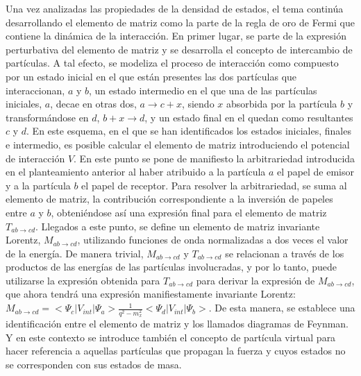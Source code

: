 Una vez analizadas las propiedades de la densidad de estados, el tema continúa desarrollando el elemento de matriz como la parte de la regla de oro de Fermi que contiene la dinámica de la interacción. En primer lugar, se parte de la expresión perturbativa del elemento de matriz y se desarrolla el concepto de intercambio de partículas. A tal efecto, se modeliza el proceso de interacción como compuesto por un estado inicial en el que están presentes las dos partículas que interaccionan, $a$ y $b$, un estado intermedio en el que una de las partículas iniciales, $a$, decae en otras dos, $a\rightarrow c + x$, siendo $x$ absorbida por la partícula $b$ y transformándose en $d$, $b + x\rightarrow d$, y un estado final en el quedan como resultantes $c$ y $d$. En este esquema, en el que se han identificados los estados iniciales, finales e intermedio, es posible calcular el elemento de matriz introduciendo el potencial de interacción $V$. En este punto se pone de manifiesto la arbitrariedad introducida en el planteamiento anterior al haber atribuido a la partícula $a$ el papel de emisor y a la partícula $b$ el papel de receptor. Para resolver la arbitrariedad, se suma al elemento de matriz, la contribución correspondiente a la inversión de papeles entre $a$ y $b$, obteniéndose así una expresión final para el elemento de matriz $T_{ab\rightarrow cd}$. Llegados a este punto, se define un elemento de matriz invariante Lorentz, $M_{ab\rightarrow cd}$, utilizando funciones de onda normalizadas a dos veces el valor de la energía. De manera trivial, $M_{ab\rightarrow cd}$ y $T_{ab\rightarrow cd}$ se relacionan a través de los productos de las energías de las partículas involucradas, y por lo tanto, puede utilizarse la expresión obtenida para $T_{ab\rightarrow cd}$ para derivar la expresión de $M_{ab\rightarrow cd}$, que ahora tendrá una expresión manifiestamente invariante Lorentz: $M_{ab\rightarrow cd}=<\Psi_c|V_{int}|\Psi_a>\frac{1}{q^2-m_{x}^2}<\Psi_d|V_{int}|\Psi_b>$. De esta manera, se establece una identificación entre el elemento de matriz y los llamados diagramas de Feynman. Y en este contexto se introduce también el concepto de partícula virtual para hacer referencia a aquellas partículas que propagan la fuerza y cuyos estados no se corresponden con sus estados de masa. 

